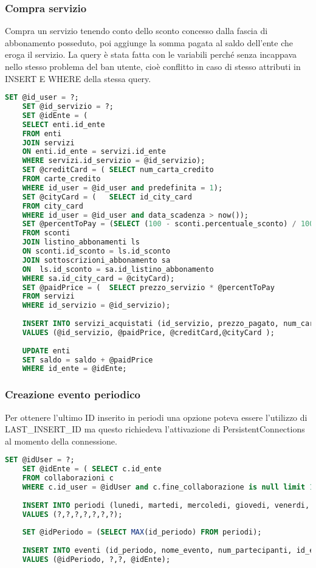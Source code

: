 \subsubsection{Compra servizio}
Compra un servizio tenendo conto dello sconto concesso dalla fascia di abbonamento posseduto, poi aggiunge la somma pagata al saldo dell'ente che eroga il servizio.
La query è stata fatta con le variabili perché senza incappava nello stesso problema del ban utente, cioè conflitto in caso di stesso attributi in INSERT E WHERE della stessa query.
\begin{lstlisting}[language=SQL]
	SET @id_user = ?;
	SET @id_servizio = ?;
	SET @idEnte = (
	SELECT enti.id_ente 
	FROM enti
	JOIN servizi
	ON enti.id_ente = servizi.id_ente
	WHERE servizi.id_servizio = @id_servizio);
	SET @creditCard = ( SELECT num_carta_credito 
	FROM carte_credito
	WHERE id_user = @id_user and predefinita = 1);
	SET @cityCard = (   SELECT id_city_card
	FROM city_card
	WHERE id_user = @id_user and data_scadenza > now());
	SET @percentToPay = (SELECT (100 - sconti.percentuale_sconto) / 100
	FROM sconti 
	JOIN listino_abbonamenti ls 
	ON sconti.id_sconto = ls.id_sconto
	JOIN sottoscrizioni_abbonamento sa
	ON  ls.id_sconto = sa.id_listino_abbonamento
	WHERE sa.id_city_card = @cityCard);
	SET @paidPrice = (  SELECT prezzo_servizio * @percentToPay
	FROM servizi
	WHERE id_servizio = @id_servizio);
	
	INSERT INTO servizi_acquistati (id_servizio, prezzo_pagato, num_carta_credito, id_city_card) 
	VALUES (@id_servizio, @paidPrice, @creditCard,@cityCard );
	
	UPDATE enti 
	SET saldo = saldo + @paidPrice
	WHERE id_ente = @idEnte;
\end{lstlisting}




\subsubsection{Creazione evento periodico}
Per ottenere l'ultimo ID inserito in periodi una opzione poteva essere l'utilizzo di LAST{\_}INSERT{\_}ID ma questo richiedeva l'attivazione di PersistentConnections al momento della connessione.

\begin{lstlisting}[language=SQL]
	SET @idUser = ?;
	SET @idEnte = ( SELECT c.id_ente
	FROM collaborazioni c
	WHERE c.id_user = @idUser and c.fine_collaborazione is null limit 1);
	
	INSERT INTO periodi (lunedi, martedi, mercoledi, giovedi, venerdi, sabato, domenica) 
	VALUES (?,?,?,?,?,?,?);
	
	SET @idPeriodo = (SELECT MAX(id_periodo) FROM periodi);
	
	INSERT INTO eventi (id_periodo, nome_evento, num_partecipanti, id_ente) 
	VALUES (@idPeriodo, ?,?, @idEnte);
\end{lstlisting}


